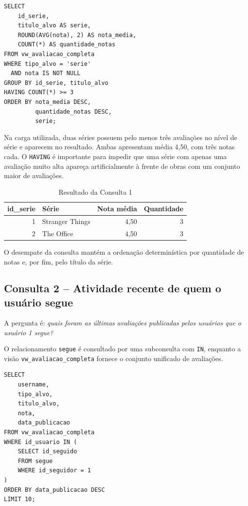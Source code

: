 \documentclass[a4paper,12pt,oneside,openany]{book}
\newcommand{\id}[1]{\texttt{#1}}
\begin{document}
\begin{lstlisting}[caption={Consulta 1 -- ranking de séries por nota média},label={lst:consulta1}]
SELECT
    id_serie,
    titulo_alvo AS serie,
    ROUND(AVG(nota), 2) AS nota_media,
    COUNT(*) AS quantidade_notas
FROM vw_avaliacao_completa
WHERE tipo_alvo = 'serie'
  AND nota IS NOT NULL
GROUP BY id_serie, titulo_alvo
HAVING COUNT(*) >= 3
ORDER BY nota_media DESC,
         quantidade_notas DESC,
         serie;
\end{lstlisting}

Na carga utilizada, duas séries possuem pelo menos três avaliações no nível de
série e aparecem no resultado. Ambas apresentam média 4,50, com três notas cada.
O \id{HAVING} é importante para impedir que uma série com apenas uma avaliação
muito alta apareça artificialmente à frente de obras com um conjunto maior de
avaliações.

\begin{table}[H]
\centering
\caption{Resultado da Consulta 1}
\label{tab:resultado-consulta1}
\begin{tabular}{@{}r l r r@{}}
\toprule
\textbf{id\_serie} & \textbf{Série} & \textbf{Nota média} & \textbf{Quantidade} \\
\midrule
1 & Stranger Things & 4,50 & 3 \\
2 & The Office & 4,50 & 3 \\
\bottomrule
\end{tabular}
\end{table}

O desempate da consulta mantém a ordenação determinística por quantidade de
notas e, por fim, pelo título da série.

\subsection{Consulta 2 -- Atividade recente de quem o usuário segue}

A pergunta é: \textit{quais foram as últimas avaliações publicadas pelos
usuários que o usuário 1 segue?}

O relacionamento \id{segue} é consultado por uma subconsulta com \id{IN},
enquanto a visão \id{vw\_avaliacao\_completa} fornece o conjunto unificado de
avaliações.

\begin{lstlisting}[caption={Consulta 2 -- atividade recente de quem o usuário segue},label={lst:consulta2}]
SELECT
    username,
    tipo_alvo,
    titulo_alvo,
    nota,
    data_publicacao
FROM vw_avaliacao_completa
WHERE id_usuario IN (
    SELECT id_seguido
    FROM segue
    WHERE id_seguidor = 1
)
ORDER BY data_publicacao DESC
LIMIT 10;
\end{lstlisting}
\end{document}
